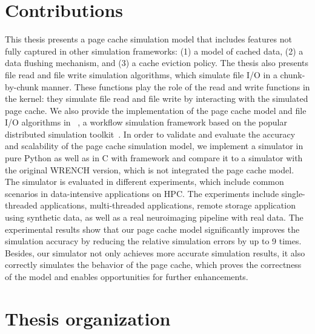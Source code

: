 \section{Contributions}

This thesis presents a page cache simulation model that includes features not fully captured in other 
simulation frameworks: (1) a model of cached data,
 (2) a data flushing mechanism, and (3) 
a cache eviction policy.  
The thesis also presents file read and file write simulation algorithms, 
which simulate file I/O in a chunk-by-chunk manner. 
These functions play the role of the read and write functions in the kernel: they
simulate file read and file write by interacting with the simulated page cache.
We also provide the implementation of the page cache model and
file I/O algorithms in \wrench~\cite{casanova2020fgcs}, 
a workflow simulation framework based on the popular 
\simgrid distributed simulation toolkit~\cite{casanova2014simgrid}. 
In order to validate and evaluate the accuracy and scalability of the page cache 
simulation model, we implement a simulator in pure Python as well as 
in C with \wrench framework and compare it to a simulator with the original 
WRENCH version, which is not integrated the page cache model. 
The simulator is evaluated in different experiments, which include common 
scenarios in data-intensive applications on HPC.
The experiments include single-threaded applications, multi-threaded applications, 
remote storage application using synthetic data, as well as a real neuroimaging 
pipeline with real data.
The experimental results show that our page cache model significantly improves 
the simulation accuracy by reducing the relative simulation errors by up to 9 times. 
Besides, our simulator not only achieves more accurate simulation results, 
it also correctly simulates the behavior of the page cache, which proves the correctness 
of the model and enables opportunities for further enhancements. 

\section{Thesis organization}

